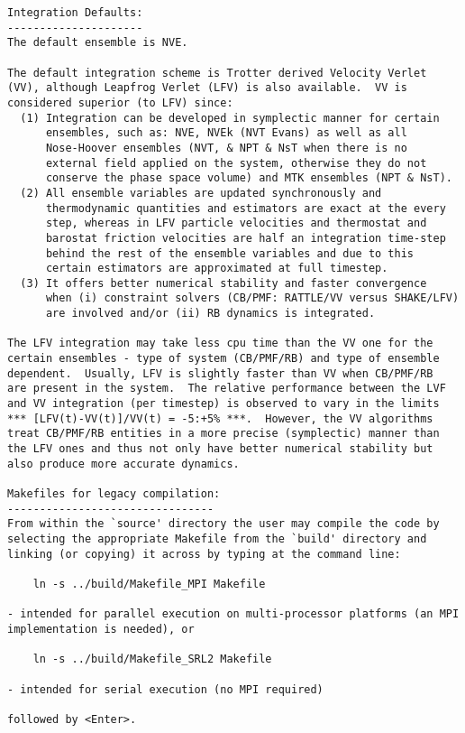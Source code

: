 \begin{verbatim}
Integration Defaults:
---------------------
The default ensemble is NVE.

The default integration scheme is Trotter derived Velocity Verlet
(VV), although Leapfrog Verlet (LFV) is also available.  VV is
considered superior (to LFV) since:
  (1) Integration can be developed in symplectic manner for certain
      ensembles, such as: NVE, NVEk (NVT Evans) as well as all
      Nose-Hoover ensembles (NVT, & NPT & NsT when there is no
      external field applied on the system, otherwise they do not
      conserve the phase space volume) and MTK ensembles (NPT & NsT).
  (2) All ensemble variables are updated synchronously and
      thermodynamic quantities and estimators are exact at the every
      step, whereas in LFV particle velocities and thermostat and
      barostat friction velocities are half an integration time-step
      behind the rest of the ensemble variables and due to this
      certain estimators are approximated at full timestep.
  (3) It offers better numerical stability and faster convergence
      when (i) constraint solvers (CB/PMF: RATTLE/VV versus SHAKE/LFV)
      are involved and/or (ii) RB dynamics is integrated.

The LFV integration may take less cpu time than the VV one for the
certain ensembles - type of system (CB/PMF/RB) and type of ensemble
dependent.  Usually, LFV is slightly faster than VV when CB/PMF/RB
are present in the system.  The relative performance between the LVF
and VV integration (per timestep) is observed to vary in the limits
*** [LFV(t)-VV(t)]/VV(t) = -5:+5% ***.  However, the VV algorithms
treat CB/PMF/RB entities in a more precise (symplectic) manner than
the LFV ones and thus not only have better numerical stability but
also produce more accurate dynamics.

Makefiles for legacy compilation:
--------------------------------
From within the `source' directory the user may compile the code by
selecting the appropriate Makefile from the `build' directory and
linking (or copying) it across by typing at the command line:

	ln -s ../build/Makefile_MPI Makefile

- intended for parallel execution on multi-processor platforms (an MPI
implementation is needed), or

	ln -s ../build/Makefile_SRL2 Makefile

- intended for serial execution (no MPI required)

followed by <Enter>.


\end{verbatim}

